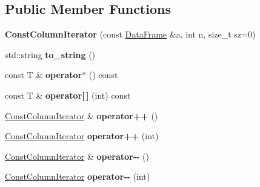 \subsection*{Public Member Functions}
\begin{DoxyCompactItemize}
\item 
\mbox{\label{classDataFrame_1_1ConstColumnIterator_aae947ed7773b4dc75bab9572f5dec9ed}} 
{\bfseries Const\+Column\+Iterator} (const \hyperlink{classDataFrame}{Data\+Frame} \&a, int n, size\+\_\+t sz=0)
\item 
\mbox{\label{classDataFrame_1_1ConstColumnIterator_a984b6589629412919f71dc5f36ebcc40}} 
std\+::string {\bfseries to\+\_\+string} ()
\item 
\mbox{\label{classDataFrame_1_1ConstColumnIterator_a3566447dd4686873cc56d0c9f9759755}} 
const T \& {\bfseries operator$\ast$} () const
\item 
\mbox{\label{classDataFrame_1_1ConstColumnIterator_a9fe179b232291b10ace5e39c9512b89a}} 
const T \& {\bfseries operator\mbox{[}$\,$\mbox{]}} (int) const
\item 
\mbox{\label{classDataFrame_1_1ConstColumnIterator_a01c8e31cd720cd852fc1045044d68865}} 
\hyperlink{classDataFrame_1_1ConstColumnIterator}{Const\+Column\+Iterator} \& {\bfseries operator++} ()
\item 
\mbox{\label{classDataFrame_1_1ConstColumnIterator_a19deac4cc676f2b54f93df10a3d89d31}} 
\hyperlink{classDataFrame_1_1ConstColumnIterator}{Const\+Column\+Iterator} {\bfseries operator++} (int)
\item 
\mbox{\label{classDataFrame_1_1ConstColumnIterator_ad9a73b33852783c9977ca6abb2db493e}} 
\hyperlink{classDataFrame_1_1ConstColumnIterator}{Const\+Column\+Iterator} \& {\bfseries operator-\/-\/} ()
\item 
\mbox{\label{classDataFrame_1_1ConstColumnIterator_a5ee96a13f1a26a51514784435d35e86c}} 
\hyperlink{classDataFrame_1_1ConstColumnIterator}{Const\+Column\+Iterator} {\bfseries operator-\/-\/} (int)
\end{DoxyCompactItemize}
